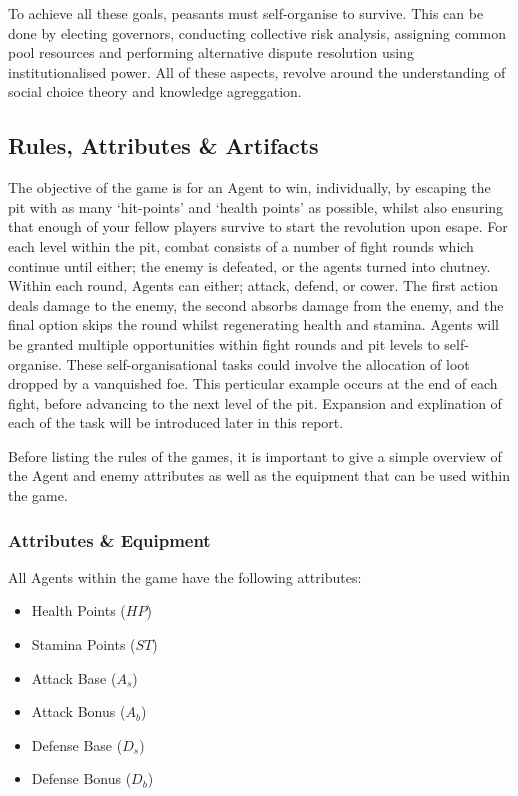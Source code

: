 To achieve all these goals, peasants must self-organise to survive. This can be done by electing governors, conducting collective risk analysis, assigning common pool resources and performing alternative dispute resolution using institutionalised power. All of these aspects, revolve around the understanding of social choice theory and knowledge agreggation. 


\subsection{Rules, Attributes \& Artifacts}\label{sec:rules}

The objective of the game is for an Agent to win, individually, by escaping the pit with as many `hit-points' and `health points' as possible, whilst also ensuring that enough of your fellow players survive to start the revolution upon esape. 
For each level within the pit, combat consists of a number of fight rounds which continue until either; the enemy is defeated, or the agents turned into chutney. Within each round, Agents can either; attack, defend, or cower. The first action deals damage to the enemy, the second absorbs damage from the enemy, and the final option skips the round whilst regenerating health and stamina.
Agents will be granted multiple opportunities within fight rounds and pit levels to self-organise. These self-organisational tasks could involve the allocation of loot dropped by a vanquished foe. This perticular example occurs at the end of each fight, before advancing to the next level of the pit. Expansion and explination of each of the task will be introduced later in this report. 

Before listing the rules of the games, it is important to give a simple overview of the Agent and enemy attributes as well as the equipment that can be used within the game.  

\subsubsection{Attributes \& Equipment}

All Agents within the game have the following attributes:

\begin{itemize} 
    \item Health Points ($HP$)
    \item Stamina Points ($ST$)
    \item Attack Base ($A_s$)
    \item Attack Bonus ($A_b$)
    \item Defense Base ($D_s$)
    \item Defense Bonus ($D_b$)
\end{itemize}

